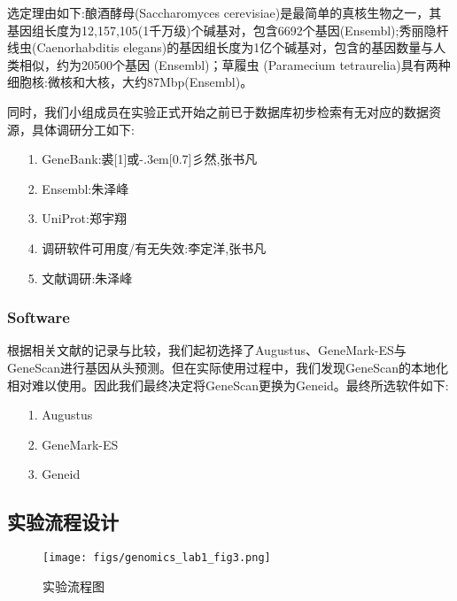 \documentclass[12pt]{ctexart}
\newcommand{\yu}{\hbox{\scalebox{1}[1]{或}\kern-.3em\scalebox{0.3}[0.7]{彡}}}
\begin{document}
选定理由如下:酿酒酵母(Saccharomyces cerevisiae)是最简单的真核生物之一，其基因组长度为12,157,105(1千万级)个碱基对，包含6692个基因(Ensembl);秀丽隐杆线虫(Caenorhabditis elegans)的基因组长度为1亿个碱基对，包含的基因数量与人类相似，约为20500个基因 (Ensembl)；草履虫 (Paramecium tetraurelia)具有两种细胞核:微核和大核，大约87Mbp(Ensembl)。

同时，我们小组成员在实验正式开始之前已于数据库初步检索有无对应的数据资源，具体调研分工如下:

\begin{itemize}
    \item [1.] GeneBank:裘\yu 然,张书凡
    \item [2.] Ensembl:朱泽峰
    \item [3.] UniProt:郑宇翔
    \item [4.] 调研软件可用度/有无失效:李定洋,张书凡
    \item [5.] 文献调研\citep{10.1016/j.csbj.2016.07.002}:朱泽峰
\end{itemize}

\subsubsection{Software}

根据相关文献\citep{10.1093/nar/gki937}的记录与比较，我们起初选择了Augustus、GeneMark-ES与GeneScan进行基因从头预测。但在实际使用过程中，我们发现GeneScan的本地化相对难以使用。因此我们最终决定将GeneScan更换为Geneid。最终所选软件如下:

\begin{itemize}
    \item [1.] Augustus
    \item [2.] GeneMark-ES
    \item [3.] Geneid
\end{itemize}

\subsection{实验流程设计}

\begin{figure}[h!]
\centering
\texttt{[image: figs/genomics\_lab1\_fig3.png]}
\caption{实验流程图}
\label{fig:任务流程图}
\end{figure}
\end{document}
